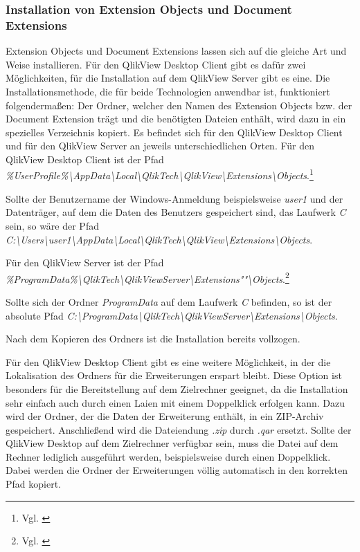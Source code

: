 \subsubsection{Installation von Extension Objects und Document Extensions}

Extension Objects und Document Extensions lassen sich auf die gleiche Art und Weise installieren. Für den QlikView Desktop Client gibt es dafür zwei Möglich\-keiten, für die Installation auf dem QlikView Server gibt es eine.
Die Installations\-methode, die für beide Technologien anwendbar ist, funktioniert folgendermaßen: Der Ordner, welcher den Namen des Extension Objects bzw. der Document Extension trägt und die benötigten Dateien enthält, wird dazu in ein spezielles Verzeichnis kopiert. Es befindet sich für den QlikView Desktop Client und für den QlikView Server an jeweils unterschiedlichen Orten. Für den QlikView Desktop Client ist der Pfad \textit{\%UserProfile\%\textbackslash{}AppData\textbackslash{}Local\textbackslash{}QlikTech\textbackslash{}QlikView\textbackslash{}Extensions\textbackslash{}Objects}.\footnote{Vgl. \cite[S. 164]{redmond2013qlikview}}

Sollte der Benutzername der Windows-Anmeldung beispielsweise \textit{user1} und der Datenträger, auf dem die Daten des Benutzers gespeichert sind, das Laufwerk \textit{C} sein, so wäre der Pfad \textit{C:\textbackslash{}Users\textbackslash{}user1\textbackslash{}AppData\textbackslash{}Local\textbackslash{}QlikTech\textbackslash{}QlikView\textbackslash{}Extensions\textbackslash{}Objects}.

Für den QlikView Server ist der Pfad \textit{\%ProgramData\%\textbackslash{}QlikTech\textbackslash{}QlikViewServer\textbackslash{}Extensions""\textbackslash{}Objects}.\footnote{Vgl. \cite[S. 164]{redmond2013qlikview}} 

Sollte sich der Ordner \textit{ProgramData} auf dem Laufwerk \textit{C} befinden, so ist der absolute Pfad \textit{C:\textbackslash{}ProgramData\textbackslash{}QlikTech\textbackslash{}QlikViewServer\textbackslash{}Extensions\textbackslash{}Objects}.

Nach dem Kopieren des Ordners ist die Installation bereits vollzogen.

Für den QlikView Desktop Client gibt es eine weitere Möglich\-keit, in der die Lokalisation des Ordners für die Erweiterungen erspart bleibt. Diese Option ist besonders für die Bereitstellung auf dem Zielrechner geeignet, da die Installation sehr einfach auch durch einen Laien mit einem Doppelklick erfolgen kann. Dazu wird der Ordner, der die Daten der Erweiterung enthält, in ein ZIP-Archiv gespeichert. Anschließend wird die Datei\-endung \textit{.zip} durch \textit{.qar} ersetzt. Sollte der QlikView Desktop auf dem Zielrechner verfügbar sein, muss die Datei auf dem Rechner lediglich ausgeführt werden, beispielsweise durch einen Doppelklick. Dabei werden die Ordner der Erweiterungen völlig automatisch in den korrekten Pfad kopiert.


